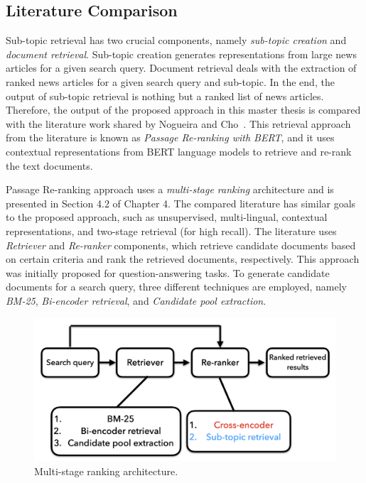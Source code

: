 \subsection{Literature Comparison}

Sub-topic retrieval has two crucial components, namely \emph{sub-topic creation} and \emph{document retrieval}. Sub-topic creation generates representations from large news articles for a given search query. Document retrieval deals with the extraction of ranked news articles for a given search query and sub-topic. In the end, the output of sub-topic retrieval is nothing but a ranked list of news articles. Therefore, the output of the proposed approach in this master thesis is compared with the literature work shared by Nogueira and Cho~\cite{nogueira2019passage}. This retrieval approach from the literature is known as \emph{Passage Re-ranking with \ac{BERT}}, and it uses contextual representations from \ac{BERT} language models to retrieve and re-rank the text documents.



Passage Re-ranking approach uses a \emph{multi-stage ranking} architecture and is presented in Section 4.2 of Chapter 4. The compared literature has similar goals to the proposed approach, such as unsupervised, multi-lingual, contextual representations, and two-stage retrieval (for high recall). The literature uses \emph{Retriever} and \emph{Re-ranker} components, which retrieve candidate documents based on certain criteria and rank the retrieved documents, respectively. This approach was initially proposed for question-answering tasks. To generate candidate documents for a search query, three different techniques are employed, namely \emph{BM-25}, \emph{Bi-encoder retrieval}, and \emph{Candidate pool extraction}.


\begin{figure}[h]
	\centering
	\includegraphics[width=.9\textwidth]{images/thesis_images/literature_review.png}
	\caption{Multi-stage ranking architecture. \label{fig:literature_review}}
\end{figure}

